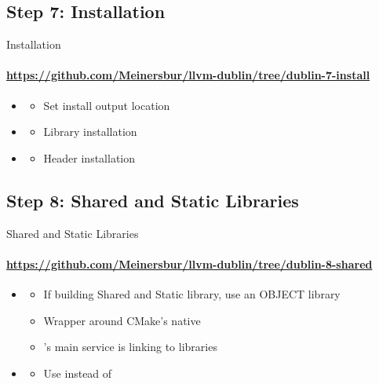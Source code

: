 \subsection{Step 7: Installation}
\begin{frame}[fragile]{Installation}
\framesubtitle{\url{https://github.com/Meinersbur/llvm-dublin/tree/dublin-7-install}}
\begin{itemize}
\item[\pgfuseimage{file}] 
  \begin{itemize}
  \item Set install output location
  \end{itemize}
\item[\pgfuseimage{file}] 
  \begin{itemize}
  \item Library installation
  \end{itemize}
\item[\pgfuseimage{file}] 
  \begin{itemize}
  \item Header installation
  \end{itemize}
\end{itemize}
\end{frame}



\subsection{Step 8: Shared and Static Libraries}
\begin{frame}[fragile]{Shared and Static Libraries}
\framesubtitle{\url{https://github.com/Meinersbur/llvm-dublin/tree/dublin-8-shared}}
\begin{itemize}
\item[\pgfuseimage{file}] 
  \begin{itemize}
  \item If building Shared and Static library, use an OBJECT library
  \item Wrapper around CMake's native 
  \item {}'s  main service is linking to \LLVM libraries
  \end{itemize}
\item[\pgfuseimage{file}] 
  \begin{itemize}
  \item Use  instead of 
  \end{itemize}
\end{itemize}
\end{frame}



